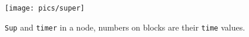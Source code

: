 \documentclass[10pt]{article}
\theoremstyle{definition}
\begin{document}
%
%
%
%
\begin{figure}[hbt]
  \center\texttt{[image: pics/super]}
  \caption{\texttt{Sup} and \texttt{timer} in a node, numbers on blocks are their \texttt{time} values.}
\end{figure}
\end{document}
